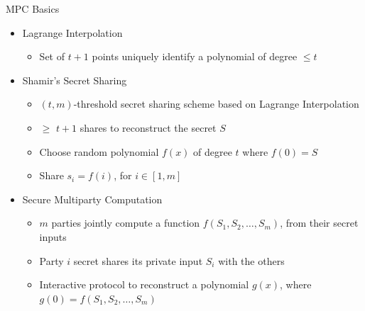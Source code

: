 \begin{frame}{MPC Basics}
\protect\hypertarget{mpc-basics}{}
\begin{itemize}
\tightlist
\item
  Lagrange Interpolation

  \begin{itemize}
  \tightlist
  \item
    Set of \(t+1\) points uniquely identify a polynomial of degree
    \(\leq t\)
  \end{itemize}
\item
  Shamir's Secret Sharing

  \begin{itemize}
  \tightlist
  \item
    \((t, m)\)-threshold secret sharing scheme based on Lagrange
    Interpolation
  \item
    \(\geq\) \(t+1\) shares to reconstruct the secret \(S\)
  \item
    Choose random polynomial \(f(x)\) of degree \(t\) where \(f(0) = S\)
  \item
    Share \(s_i = f(i)\), for \(i \in [1,m]\)
  \end{itemize}
\item
  Secure Multiparty Computation

  \begin{itemize}
  \tightlist
  \item
    \(m\) parties jointly compute a function
    \(f(S_{1},S_{2},\dots,S_{m})\), from their secret inputs
  \item
    Party \(i\) secret shares its private input \(S_{i}\) with the
    others
  \item
    Interactive protocol to reconstruct a polynomial \(g(x)\), where
    \(g(0)=f(S_1, S_2, \dots, S_m)\)
  \end{itemize}
\end{itemize}
\end{frame}

